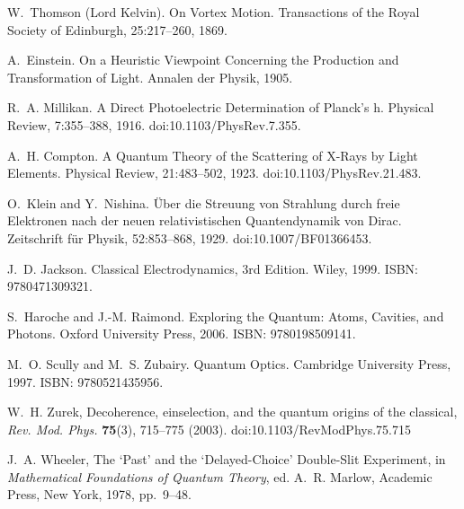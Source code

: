 \documentclass[11pt,a4paper]{article}
\begin{document}
\begin{thebibliography}{99}
W.~Thomson (Lord Kelvin).
On Vortex Motion.
Transactions of the Royal Society of Edinburgh, 25:217--260, 1869.

A.~Einstein.
On a Heuristic Viewpoint Concerning the Production and Transformation of Light.
Annalen der Physik, 1905.

R.~A. Millikan.
A Direct Photoelectric Determination of Planck's h.
Physical Review, 7:355--388, 1916.
doi:10.1103/PhysRev.7.355.

A.~H. Compton.
A Quantum Theory of the Scattering of X-Rays by Light Elements.
Physical Review, 21:483--502, 1923.
doi:10.1103/PhysRev.21.483.

O.~Klein and Y.~Nishina.
{\"U}ber die Streuung von Strahlung durch freie Elektronen nach der neuen relativistischen Quantendynamik von Dirac.
Zeitschrift f{\"u}r Physik, 52:853--868, 1929.
doi:10.1007/BF01366453.

J.~D. Jackson.
Classical Electrodynamics, 3rd Edition.
Wiley, 1999.
ISBN: 9780471309321.

S.~Haroche and J.-M. Raimond.
Exploring the Quantum: Atoms, Cavities, and Photons.
Oxford University Press, 2006.
ISBN: 9780198509141.

M.~O. Scully and M.~S. Zubairy.
Quantum Optics.
Cambridge University Press, 1997.
ISBN: 9780521435956.

W.~H. Zurek,
Decoherence, einselection, and the quantum origins of the classical,
\emph{Rev. Mod. Phys.} \textbf{75}(3), 715--775 (2003).
doi:10.1103/RevModPhys.75.715

J.~A. Wheeler,
The `Past' and the `Delayed-Choice' Double-Slit Experiment,
in \emph{Mathematical Foundations of Quantum Theory}, ed. A.~R. Marlow,
Academic Press, New York, 1978, pp.~9--48.

\end{thebibliography}
\end{document}
